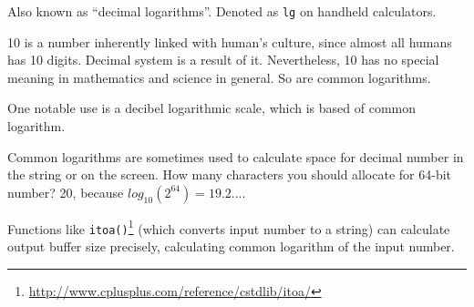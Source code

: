 
Also known as ``decimal logarithms''.
Denoted as \texttt{lg} on handheld calculators.

10 is a number inherently linked with human's culture, since almost all humans has 10 digits.
Decimal system is a result of it.
Nevertheless, 10 has no special meaning in mathematics and science in general.
So are common logarithms.

One notable use is a decibel logarithmic scale, which is based of common logarithm.

Common logarithms are sometimes used to calculate space for decimal number in the string or on the screen.
How many characters you should allocate for 64-bit number? 20, because $log_{10}(2^{64}) = 19.2...$.

Functions like \texttt{itoa()}\footnote{\url{http://www.cplusplus.com/reference/cstdlib/itoa/}}
(which converts input number to a string) can calculate output buffer size precisely, 
calculating common logarithm of the input number.

